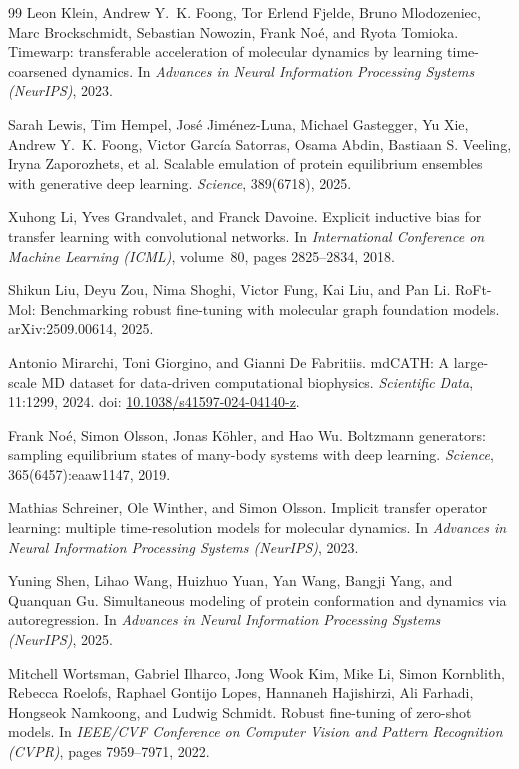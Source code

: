 \documentclass{article}
\providecommand{\doi}[1]{doi: {\urlstyle{rm}\url{#1}}}
\begin{document}
\begin{thebibliography}{99}
Leon Klein, Andrew Y.~K. Foong, Tor Erlend Fjelde, Bruno Mlodozeniec, Marc Brockschmidt, Sebastian Nowozin, Frank No\'{e}, and Ryota Tomioka.
Timewarp: transferable acceleration of molecular dynamics by learning time-coarsened dynamics.
In \emph{Advances in Neural Information Processing Systems (NeurIPS)}, 2023.

Sarah Lewis, Tim Hempel, Jos\'{e} Jim\'{e}nez-Luna, Michael Gastegger, Yu Xie, Andrew Y.~K. Foong, Victor Garc\'{i}a Satorras, Osama Abdin, Bastiaan S. Veeling, Iryna Zaporozhets, et al.
Scalable emulation of protein equilibrium ensembles with generative deep learning.
\emph{Science}, 389(6718), 2025.

Xuhong Li, Yves Grandvalet, and Franck Davoine.
Explicit inductive bias for transfer learning with convolutional networks.
In \emph{International Conference on Machine Learning (ICML)}, volume~80, pages 2825--2834, 2018.

Shikun Liu, Deyu Zou, Nima Shoghi, Victor Fung, Kai Liu, and Pan Li.
RoFt-Mol: Benchmarking robust fine-tuning with molecular graph foundation models.
arXiv:2509.00614, 2025.

Antonio Mirarchi, Toni Giorgino, and Gianni De Fabritiis.
mdCATH: A large-scale MD dataset for data-driven computational biophysics.
\emph{Scientific Data}, 11:1299, 2024.
\doi{10.1038/s41597-024-04140-z}.

Frank No\'{e}, Simon Olsson, Jonas K\"{o}hler, and Hao Wu.
Boltzmann generators: sampling equilibrium states of many-body systems with deep learning.
\emph{Science}, 365(6457):eaaw1147, 2019.

Mathias Schreiner, Ole Winther, and Simon Olsson.
Implicit transfer operator learning: multiple time-resolution models for molecular dynamics.
In \emph{Advances in Neural Information Processing Systems (NeurIPS)}, 2023.

Yuning Shen, Lihao Wang, Huizhuo Yuan, Yan Wang, Bangji Yang, and Quanquan Gu.
Simultaneous modeling of protein conformation and dynamics via autoregression.
In \emph{Advances in Neural Information Processing Systems (NeurIPS)}, 2025.

Mitchell Wortsman, Gabriel Ilharco, Jong Wook Kim, Mike Li, Simon Kornblith, Rebecca Roelofs, Raphael Gontijo Lopes, Hannaneh Hajishirzi, Ali Farhadi, Hongseok Namkoong, and Ludwig Schmidt.
Robust fine-tuning of zero-shot models.
In \emph{IEEE/CVF Conference on Computer Vision and Pattern Recognition (CVPR)}, pages 7959--7971, 2022.


\end{thebibliography}
\end{document}
